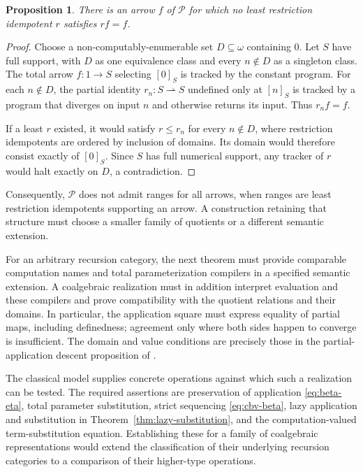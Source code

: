 \documentclass[11pt]{article}
\newtheorem{proposition}[theorem]{Proposition}
\theoremstyle{definition}
\newcommand{\N}{\omega}
\newcommand{\Pcat}{\mathcal P}
\begin{document}
\begin{proposition}\label{prop:no-least-range}
There is an arrow $f$ of $\Pcat$ for which no least restriction
idempotent $r$ satisfies $rf=f$.
\end{proposition}
\begin{proof}
Choose a non-computably-enumerable set $D\subseteq\N$ containing
$0$. Let $S$ have full support, with $D$ as one equivalence class
and every $n\notin D$ as a singleton class. The total arrow
$f:1\to S$ selecting $[0]_S$ is tracked by the constant program.
For each $n\notin D$, the partial identity $r_n:S\rightharpoonup S$
undefined only at $[n]_S$ is tracked by a program that diverges on
input $n$ and otherwise returns its input. Thus $r_nf=f$.

If a least $r$ existed, it would satisfy $r\leq r_n$ for every
$n\notin D$, where restriction idempotents are ordered by inclusion
of domains. Its domain would therefore consist exactly of $[0]_S$.
Since $S$ has full numerical support, any tracker of $r$ would halt
exactly on $D$, a contradiction.
\end{proof}

Consequently, $\Pcat$ does not admit ranges for all arrows, when ranges
are least restriction idempotents supporting an arrow. A construction
retaining that structure must choose a smaller family of quotients
or a different semantic extension.

For an arbitrary recursion category, the next theorem must provide
comparable computation names and total parameterization compilers in
a specified semantic extension. A coalgebraic realization must in
addition interpret evaluation and these compilers and prove compatibility
with the quotient relations and their domains. In particular, the
application square must express equality of partial maps, including
definedness; agreement only where both sides happen to converge is
insufficient. The domain and value conditions are precisely those in
the partial-application descent proposition of
\cite[section ``Application on quotient types'']{External}.

The classical model supplies concrete operations against which such
a realization can be tested. The required assertions are preservation
of application \eqref{eq:beta-eta}, total parameter substitution,
strict sequencing \eqref{eq:cbv-beta}, lazy application and
substitution in Theorem~\ref{thm:lazy-substitution}, and the
computation-valued term-substitution equation. Establishing these for a family of
coalgebraic representations would extend the classification of their
underlying recursion categories to a comparison of their higher-type
operations.
\end{document}
